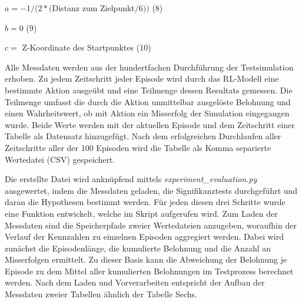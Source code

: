 \begin{description}
    \item \begin{center} $ a = -1 / (2 * ($Distanz zum Zielpunkt$ / 6))$ (8)\end{center}
    \item \begin{center} $ b = 0$ (9)\end{center}
    \item \begin{center} $ c = $ Z-Koordinate des Startpunktes (10)\end{center}
\end{description}

Alle Messdaten werden aus der hundertfachen Durchführung der Testsimulation erhoben.
Zu jedem Zeitschritt jeder Episode wird durch das RL-Modell eine bestimmte Aktion ausgeübt und eine Teilmenge dessen Resultats gemessen.
Die Teilmenge umfasst die durch die Aktion unmittelbar ausgelöste Belohnung und einen Wahrheitswert, ob mit Aktion ein Misserfolg der Simulation eingegangen wurde.
Beide Werte werden mit der aktuellen Episode und dem Zeitschritt einer Tabelle als Datensatz hinzugefügt.
Nach dem erfolgreichen Durchlaufen aller Zeitschritte aller der 100 Episoden wird die Tabelle als Komma separierte Wertedatei (CSV) gespeichert.

Die erstellte Datei wird anknüpfend mittels \textit{experiment\_evaluation.py} ausgewertet, indem die Messdaten geladen, die Signifikanztests durchgeführt und daran die Hypothesen bestimmt werden.
Für jeden diesen drei Schritte wurde eine Funktion entwickelt, welche im Skript aufgerufen wird.
Zum Laden der Messdaten sind die Speicherpfade zweier Wertedateien anzugeben, woraufhin der Verlauf der Kennzahlen zu einzelnen Episoden aggregiert werden.
Dabei wird zunächst die Episodenlänge, die kumulierte Belohnung und die Anzahl an Misserfolgen ermittelt.
Zu dieser Basis kann die Abweichung der Belohnung je Episode zu dem Mittel aller kumulierten Belohnungen im Testprozess berechnet werden. 
Nach dem Laden und Vorverarbeiten entspricht der Aufbau der Messdaten zweier Tabellen ähnlich der Tabelle Sechs.

